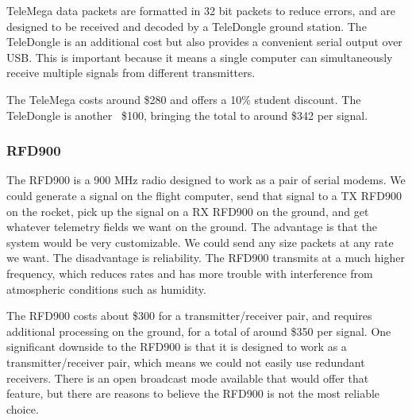 \documentclass[onecolumn, draftclsnofoot, 10pt, compsoc]{IEEEtran}
\begin{document}
TeleMega data packets are formatted in 32 bit packets to reduce errors, and are designed to be received and decoded by a TeleDongle ground station.  The TeleDongle is an additional cost but also provides a convenient serial output over USB.  This is important because it means a single computer can simultaneously receive multiple signals from different transmitters.\cite{10}

The TeleMega costs around \$280 and offers a 10\% student discount.  The TeleDongle is another ~\$100, bringing the total to around \$342 per signal.

\subsubsection{RFD900}
The RFD900 is a 900 MHz radio designed to work as a pair of serial modems.  We could generate a signal on the flight computer, send that signal to a TX RFD900 on the rocket, pick up the signal on a RX RFD900 on the ground, and get whatever telemetry fields we want on the ground.  The advantage is that the system would be very customizable.  We could send any size packets at any rate we want.  The disadvantage is reliability.  The RFD900 transmits at a much higher frequency, which reduces rates and has more trouble with interference from atmospheric conditions such as humidity.\cite{1}

The RFD900 costs about \$300 for a transmitter/receiver pair, and requires additional processing on the ground, for a total of around \$350 per signal.  One significant downside to the RFD900 is that it is designed to work as a transmitter/receiver pair, which means we could not easily use redundant receivers.  There is an open broadcast mode available that would offer that feature, but there are reasons to believe the RFD900 is not the most reliable choice.
\end{document}
